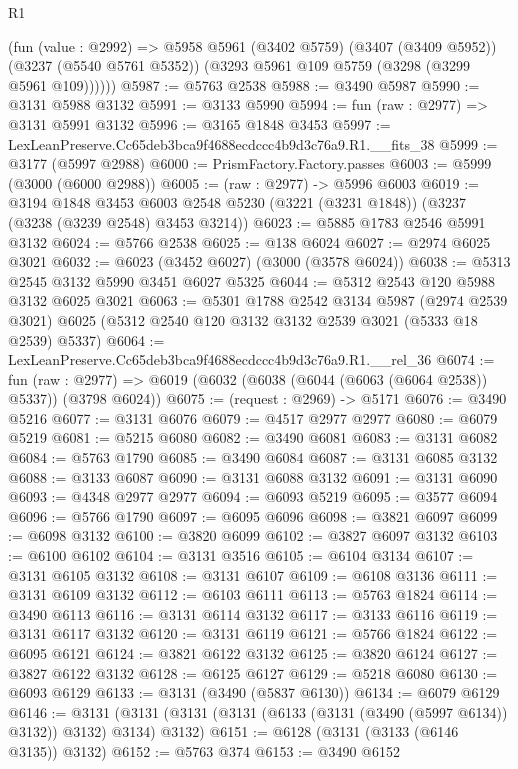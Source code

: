 \begin{lexlean}{R1}
\begin{coremodule}
        (fun (value : @2992) =>
        @5958
          @5961
          (@3402 @5759)
          (@3407 (@3409 @5952))
          (@3237 (@5540 @5761 @5352))
          (@3293 @5961 @109 @5759 (@3298 (@3299 @5961 @109))))))
@5987 := @5763 @2538
@5988 := @3490 @5987
@5990 := @3131 @5988 @3132
@5991 := @3133 @5990
@5994 := fun (raw : @2977) => @3131 @5991 @3132
@5996 := @3165 @1848 @3453
@5997 := LexLeanPreserve.Cc65deb3bca9f4688ecdccc4b9d3c76a9.R1.__fits_38
@5999 := @3177 (@5997 @2988)
@6000 := PrismFactory.Factory.passes
@6003 := @5999 (@3000 (@6000 @2988))
@6005 := (raw : @2977) -> @5996 @6003
@6019 := @3194
    @1848
    @3453
    @6003
    @2548
    @5230
    (@3221 (@3231 @1848))
    (@3237 (@3238 (@3239 @2548) @3453 @3214))
@6023 := @5885 @1783 @2546 @5991 @3132
@6024 := @5766 @2538
@6025 := @138 @6024
@6027 := @2974 @6025 @3021
@6032 := @6023 (@3452 @6027) (@3000 (@3578 @6024))
@6038 := @5313 @2545 @3132 @5990 @3451 @6027 @5325
@6044 := @5312 @2543 @120 @5988 @3132 @6025 @3021
@6063 := @5301
    @1788
    @2542
    @3134
    @5987
    (@2974 @2539 @3021)
    @6025
    (@5312 @2540 @120 @3132 @3132 @2539 @3021 (@5333 @18 @2539) @5337)
@6064 := LexLeanPreserve.Cc65deb3bca9f4688ecdccc4b9d3c76a9.R1.__rel_36
@6074 := fun (raw : @2977) =>
  @6019 (@6032 (@6038 (@6044 (@6063 (@6064 @2538)) @5337)) (@3798 @6024))
@6075 := (request : @2969) -> @5171
@6076 := @3490 @5216
@6077 := @3131 @6076
@6079 := @4517 @2977 @2977
@6080 := @6079 @5219
@6081 := @5215 @6080
@6082 := @3490 @6081
@6083 := @3131 @6082
@6084 := @5763 @1790
@6085 := @3490 @6084
@6087 := @3131 @6085 @3132
@6088 := @3133 @6087
@6090 := @3131 @6088 @3132
@6091 := @3131 @6090
@6093 := @4348 @2977 @2977
@6094 := @6093 @5219
@6095 := @3577 @6094
@6096 := @5766 @1790
@6097 := @6095 @6096
@6098 := @3821 @6097
@6099 := @6098 @3132
@6100 := @3820 @6099
@6102 := @3827 @6097 @3132
@6103 := @6100 @6102
@6104 := @3131 @3516
@6105 := @6104 @3134
@6107 := @3131 @6105 @3132
@6108 := @3131 @6107
@6109 := @6108 @3136
@6111 := @3131 @6109 @3132
@6112 := @6103 @6111
@6113 := @5763 @1824
@6114 := @3490 @6113
@6116 := @3131 @6114 @3132
@6117 := @3133 @6116
@6119 := @3131 @6117 @3132
@6120 := @3131 @6119
@6121 := @5766 @1824
@6122 := @6095 @6121
@6124 := @3821 @6122 @3132
@6125 := @3820 @6124
@6127 := @3827 @6122 @3132
@6128 := @6125 @6127
@6129 := @5218 @6080
@6130 := @6093 @6129
@6133 := @3131 (@3490 (@5837 @6130))
@6134 := @6079 @6129
@6146 := @3131 (@3131 (@3131 (@3131 (@6133 (@3131 (@3490 (@5997 @6134)) @3132)) @3132) @3134) @3132)
@6151 := @6128 (@3131 (@3133 (@6146 @3135)) @3132)
@6152 := @5763 @374
@6153 := @3490 @6152

\end{coremodule}
\end{lexlean}
